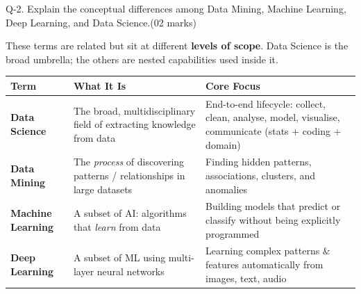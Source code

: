\documentclass[11pt,a4paper]{article}
\newcommand{\question}[3][05 marks]{%
  \begin{qbox}#2\hfill\textcolor{accent}{(#1)}\\[2pt]#3\end{qbox}%
}
\begin{document}
\question[02 marks]{Q-2. Explain the conceptual differences among Data Mining, Machine Learning, Deep Learning, and Data Science.}{}

These terms are related but sit at different \textbf{levels of scope}. Data Science is the broad umbrella; the others are nested capabilities used inside it.

\begin{center}
\begin{tabular}{@{}>{\bfseries}p{2.7cm}p{4.2cm}p{5.6cm}@{}}
\toprule
\rowcolor{primary!15}
\textbf{Term} & \textbf{What It Is} & \textbf{Core Focus} \\
\midrule
Data Science & The broad, multidisciplinary field of extracting knowledge from data & End-to-end lifecycle: collect, clean, analyse, model, visualise, communicate (stats + coding + domain) \\
Data Mining & The \emph{process} of discovering patterns / relationships in large datasets & Finding hidden patterns, associations, clusters, and anomalies \\
Machine Learning & A subset of AI: algorithms that \emph{learn} from data & Building models that predict or classify without being explicitly programmed \\
Deep Learning & A subset of ML using multi-layer neural networks & Learning complex patterns \& features automatically from images, text, audio \\
\bottomrule
\end{tabular}
\end{center}

\begin{center}
\end{center}
\end{document}
